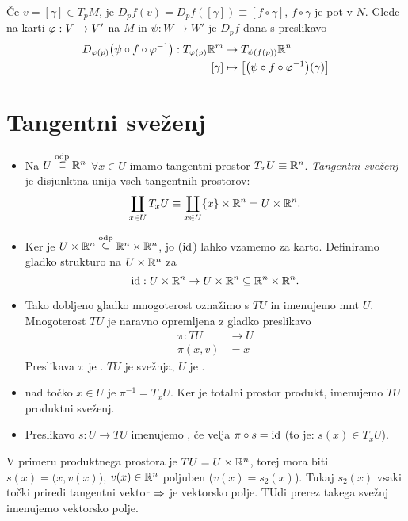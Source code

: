 \v Ce $v = [\gamma] \in T_pM$, je $D_pf(v) = D_pf([\gamma]) \equiv [f \circ \gamma]$, $f \circ \gamma$ je pot v $N$. Glede na karti $\varphi : V \to V'$ na $M$
in $\psi : W \to W'$ je $D_pf$ dana s preslikavo
\begin{align*}
	D_{\varphi(p)}\big(\psi \circ f \circ \varphi^{-1}\big) : T_{\varphi(p)}\mathbb{R}^m &\to T_{\psi(f(p))}\mathbb{R}^n \\
	[\gamma] &\mapsto \big[\big(\psi \circ f \circ \varphi^{-1}\big)(\gamma)\big]
\end{align*}

\section{Tangentni sve\v zenj}
\begin{defin}
	\begin{itemize}
		\item{Na $U \stackrel{\text{odp}}{\subseteq} \mathbb{R}^n$ $\forall x \in U$ imamo tangentni prostor $T_xU \equiv \mathbb{R}^n$. \emph{Tangentni sve\v zenj} je disjunktna unija vseh
			tangentnih prostorov:
			\[
				\coprod_{x \in U} T_xU \equiv \coprod_{x \in U} \{x\} \times \mathbb{R}^n = U \times \mathbb{R}^n.
			\]}
		\item{Ker je $U \times \mathbb{R}^n \stackrel{\text{odp}}{\subseteq} \mathbb{R}^n \times \mathbb{R}^n$, jo ($\operatorname{id}$) lahko vzamemo za karto. Definiramo gladko strukturo na $U \times \mathbb{R}^n$ za
			\[
				\operatorname{id} : U \times \mathbb{R}^n \to U \times \mathbb{R}^n \subseteq \mathbb{R}^n \times \mathbb{R}^n.
			\]}
		\item{Tako dobljeno gladko mnogoterost ozna\v zimo s $TU$ in imenujemo  mnt $U$. Mnogoterost $TU$ je
			naravno opremljena z gladko preslikavo
			\begin{align*}
				\pi : TU &\to U \\
				\pi (x, v) &= x
			\end{align*}
			Preslikava $\pi$ je . $TU$ je  sve\v znja, $U$ je .}
		\item{ nad to\v cko $x \in U$ je $\pi^{-1} = T_xU$. Ker je totalni prostor produkt, imenujemo $TU$ produktni
			sve\v zenj.}
		\item{Preslikavo $s : U \to TU$ imenujemo , \v ce velja $\pi \circ s = \operatorname{id}$ (to je: $s(x) \in T_xU$).}
	\end{itemize}
\end{defin}

V primeru produktnega prostora je $TU = U \times \mathbb{R}^n$, torej mora biti $s(x) = \big(x, v(x)\big)$, $v(x) \in \mathbb{R}^n$ poljuben ($v(x) = s_2(x)$). Tukaj
$s_2(x)$ vsaki to\v cki priredi tangentni vektor $\Rightarrow$ je vektorsko polje. TUdi prerez takega sve\v znj imenujemo vektorsko polje.

